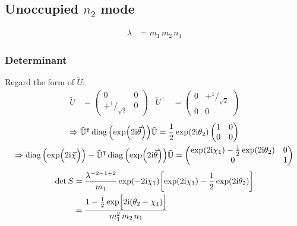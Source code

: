 \documentclass[
	english,
	a4paper,
	fontsize=10pt,
	parskip=half,
	titlepage=true,
	DIV=12,
	final
]{scrreprt}
\newcommand*{\Thus}{\ensuremath{\Rightarrow}\xspace}
\newcommand*{\smallfrac}  [2]{\ensuremath{{}^        {#1} \!/_        {#2}}}
\newcommand*{\transp}{\ensuremath{^\intercal}}
\newcommand*{\iunit}{\ensuremath{\mathrm{i}}}
\DeclareMathOperator{\diag}{diag}
\begin{document}
\subsection{Unoccupied $n_2$ mode}
\begin{align}
	\lambda
&=
	m_1 \, m_2 \, n_1
\end{align}

\subsubsection{Determinant}
Regard the form of $\tilde{U}$:
\begin{align}
	\tilde{U}
&=
	\begin{pmatrix}
		0 & 0 \\ +\smallfrac{1}{\sqrt{2}} & 0
	\end{pmatrix}
&
	\tilde{U}\transp
&=
	\begin{pmatrix}
		0 & +\smallfrac{1}{\sqrt{2}} \\ 0 & 0
	\end{pmatrix}
\end{align}
\begin{gather}
	\Thus
	\tilde{\mathbb{U}}\transp
	\diag\qty(\exp(2\iunit\vec{\theta}))
	\tilde{\mathbb{U}}
=
	\frac{1}{2} \exp(2\iunit \theta_2)
	\begin{pmatrix}
		1 & 0 \\ 0 & 0
	\end{pmatrix}
\\
	\Thus
	\diag\qty( \exp(\Big.2\iunit\vec{\chi}) )
	-
	\tilde{\mathbb{U}}\transp
	\diag\qty(\exp(2\iunit\vec{\theta}))
	\tilde{\mathbb{U}}
=
	\begin{pmatrix}
		\exp(2\iunit \chi_1) - \frac{1}{2} \exp(2\iunit \theta_2) & 0 \\
		0 & 1
	\end{pmatrix}	
\end{gather}
\begin{align}
	\det S
&=
	\frac{ \lambda^{-2 - 1 + 2} }{ m_1 }
	\exp(-2\iunit \chi_1)
	\qty[ 
		\exp(2\iunit \chi_1) - \frac{1}{2} \exp(2\iunit \theta_2)
	] \\
&=
	\frac
		{1 - \frac{1}{2} \exp[\Big. 2\iunit (\theta_2 - \chi_1)]}
		{m_1^2 \, m_2 \, n_1}
\end{align}
\end{document}
